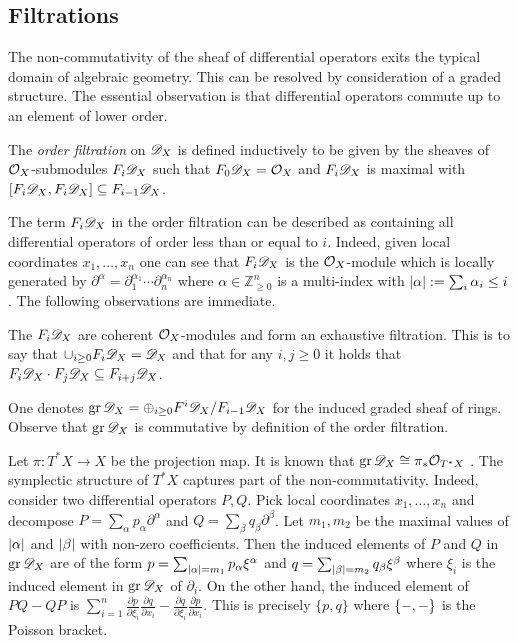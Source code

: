 \subsection{Filtrations}
The non-commutativity of the sheaf of differential operators exits the typical domain of algebraic geometry.
This can be resolved by consideration of a graded structure.
The essential observation is that differential operators commute up to an element of lower order.
\begin{definition}
  The {\it order filtration} on $\mathscr{D}_X$ is defined inductively to be given by the sheaves of $\mathcal{O}_X$-submodules $F_i \mathscr{D}_X$ such that $F_0\mathscr{D}_X = \mathcal{O}_X$ and $F_i\mathscr{D}_X$ is maximal with $[F_i\mathscr{D}_X, F_i \mathscr{D}_X] \subseteq F_{i-1}\mathscr{D}_X$.
\end{definition}
The term $F_i \mathscr{D}_X$ in the order filtration can be described as containing all differential operators of order less than or equal to $i$.
Indeed, given local coordinates $x_1,\ldots, x_n$ one can see that $F_i\mathscr{D}_X$ is the $\mathcal{O}_X$-module which is locally generated by $\partial^\alpha = \partial_1^{\alpha_1}\cdots \partial_n^{\alpha_n}$ where $\alpha\in \mathbb{Z}_{\geq 0}^n$ is a multi-index with $\vert \alpha \vert := \sum_{i}\alpha_i\leq i$.
The following observations are immediate.
\begin{lemma}
  The $F_i\mathscr{D}_X$ are coherent $\mathcal{O}_X$-modules and form an exhaustive filtration. This is to say that $\cup_{i\geq 0}F_i\mathscr{D}_X = \mathscr{D}_X$
  and that for any $i,j\geq 0$ it holds that $F_i\mathscr{D}_X \cdot F_j \mathscr{D}_X \subseteq F_{i+j}\mathscr{D}_X$.
\end{lemma}
One denotes $\operatorname{gr} \mathscr{D}_X = \oplus_{i\geq 0}F^i\mathscr{D}_X/F_{i-1}\mathscr{D}_X$ for the induced graded sheaf of rings.
Observe that $\operatorname{gr}\mathscr{D}_X$ is commutative by definition of the order filtration.

Let $\pi:T^*X \to X$ be the projection map.
It is known that $\operatorname{gr}\mathscr{D}_X \cong \pi_*\mathcal{O}_{T^*X}$ \cite[Section 2.1]{hotta2007d}.
The symplectic structure of $T^* X$ captures part of the non-commutativity.
Indeed, consider two differential operators $P, Q$.
Pick local coordinates $x_1,\ldots, x_n$ and decompose $P = \sum_{\alpha} p_\alpha \partial^\alpha $ and $Q = \sum_{\beta} q_\beta \partial^\beta$.
Let $m_1,m_2$ be the maximal values of $\vert \alpha \vert$ and $\vert \beta \vert$ with non-zero coefficients.
Then the induced elements of $P$ and $Q$ in $\operatorname{gr} \mathscr{D}_X$ are of the form $p = \sum_{\vert \alpha \vert = m_1} p_\alpha \xi^\alpha$ and $q = \sum_{\vert \beta \vert = m_2}q_\beta \xi^\beta $ where $\xi_i$ is the induced element in $\operatorname{gr}\mathscr{D}_X$ of $\partial_i$.
On the other hand, the induced element of $PQ - QP$ is $\sum_{i=1}^n\frac{\partial p}{\partial \xi_i}\frac{\partial q}{\partial x_i} - \frac{\partial q}{\partial \xi_i}\frac{\partial p}{\partial x_i}$.
This is precisely $\{p,q\}$ where $\{{-},{-}\}$ is the Poisson bracket.



